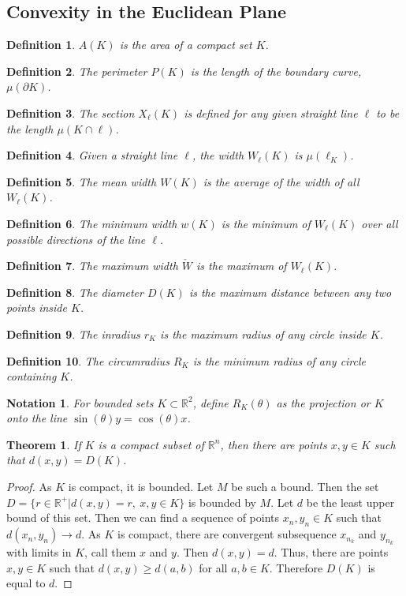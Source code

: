 \documentclass[crop=false,class=book]{standalone}
\theoremstyle{mystyle}
\newtheorem{theorem}{Theorem}[section]
\newtheorem{definition}{Definition}[section]
\newtheorem{notation}{Notation}[section]
\begin{document}
\subsection{Convexity in the Euclidean Plane}
\begin{definition}
$A(K)$ is the area of a compact set $K$.
\end{definition}
\begin{definition}
The perimeter $P(K)$ is the length of the boundary curve, $\mu(\partial K)$.
\end{definition}
\begin{definition}
The section $X_{\ell}(K)$ is defined for any given straight line $\ell$ to be the length $\mu(K\cap \ell)$.
\end{definition}
\begin{definition}
Given a straight line $\ell$, the width $W_{\ell}(K)$ is $\mu(\ell_{K})$.
\end{definition}
\begin{definition}
The mean width $W(K)$ is the average of the width of all $W_{\ell}(K)$.
\end{definition}
\begin{definition}
The minimum width $w(K)$ is the minimum of $W_{\ell}(K)$ over all possible directions of the line $\ell$.
\end{definition}
\begin{definition}
The maximum width $\check{W}$ is the maximum of $W_{\ell}(K)$.
\end{definition}
\begin{definition}
The diameter $D(K)$ is the maximum distance between any two points inside $K$.
\end{definition}
\begin{definition}
The inradius $r_K$ is the maximum radius of any circle inside $K$.
\end{definition}
\begin{definition}
The circumradius $R_K$ is the minimum radius of any circle containing $K$.
\end{definition}
\begin{notation}
For bounded sets $K\subset \mathbb{R}^2$, define $R_K(\theta)$ as the projection or $K$ onto the line $\sin(\theta)y=\cos(\theta)x$.
\end{notation}
\begin{theorem}
If $K$ is a compact subset of $\mathbb{R}^n$, then there are points $x,y\in K$ such that $d(x,y)=D(K)$.
\end{theorem}
\begin{proof}
As $K$ is compact, it is bounded. Let $M$ be such a bound. Then the set $D=\{r\in \mathbb{R}^+| d(x,y) = r,\ x,y\in K\}$ is bounded by $M$. Let $d$ be the least upper bound of this set. Then we can find a sequence of points $x_n,y_n\in K$ such that $d(x_n,y_n) \rightarrow d$. As $K$ is compact, there are convergent subsequence $x_{n_k}$ and $y_{n_k}$ with limits in $K$, call them $x$ and $y$. Then $d(x,y) = d$. Thus, there are points $x,y\in K$ such that $d(x,y) \geq d(a,b)$ for all $a,b\in K$. Therefore $D(K)$ is equal to $d$.
\end{proof}
\end{document}
